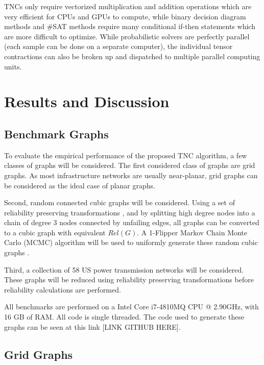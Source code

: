 TNCs only require vectorized multiplication and addition operations which are very efficient for CPUs and GPUs to compute, while binary decision diagram methods and \#SAT methods require many conditional if-then statements which are more difficult to optimize. While probabilistic solvers are perfectly parallel (each sample can be done on a separate computer), the individual tensor contractions can also be broken up and dispatched to multiple parallel computing units.

\hypertarget{results-and-discussion}{%
\section{Results and Discussion}\label{results-and-discussion}}

\hypertarget{benchmark-graphs}{%
\subsection{Benchmark Graphs}\label{benchmark-graphs}}

To evaluate the empirical performance of the proposed TNC algorithm, a few classes of graphs will be considered. The first considered class of graphs are grid graphs. As most infrastructure networks are usually near-planar, grid graphs can be considered as the ideal case of planar graphs.

Second, random connected cubic graphs will be considered. Using a set of reliability preserving transformations \cite{shooman1991exact}, and by splitting high degree nodes into a chain of degree 3 nodes connected by unfailing edges, all graphs can be converted to a cubic graph with equivalent \(Rel(G)\). A 1-Flipper Markov Chain Monte Carlo (MCMC) algorithm will be used to uniformly generate these random cubic graphs \cite{feder2006local}.

Third, a collection of 58 US power transmission networks \cite{li2016characterizing} will be considered. These graphs will be reduced using reliability preserving transformations before reliability calculations are performed.

All benchmarks are performed on a Intel Core i7-4810MQ CPU @ 2.90GHz, with 16 GB of RAM. All code is single threaded. The code used to generate these graphs can be seen at this link {[}LINK GITHUB HERE{]}.

\hypertarget{grid-graphs}{%
\subsection{Grid Graphs}\label{grid-graphs}}

